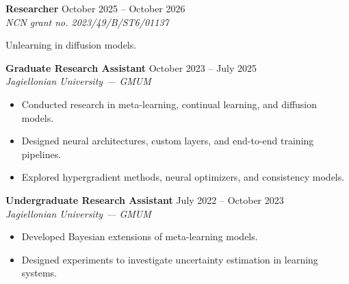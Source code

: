 \documentclass[11pt,a4paper]{article}
\begin{document}
\vspace{0.5pt}
\noindent\textbf{Researcher} \hfill {\small\color{graytext} October 2025 -- October 2026}\\
\textit{NCN grant no. 2023/49/B/ST6/01137}\par
\vspace{1pt}\noindent Unlearning in diffusion models.\par\vspace{1pt}
\vspace{0.5pt}
\noindent\textbf{Graduate Research Assistant} \hfill {\small\color{graytext} October 2023 -- July 2025}\\
\textit{Jagiellonian University --- GMUM}\par
\begin{itemize}[leftmargin=1.2em,topsep=0.5pt,itemsep=0.3pt,parsep=0pt]
  \item Conducted research in meta-learning, continual learning, and diffusion models.
  \item Designed neural architectures, custom layers, and end-to-end training pipelines.
  \item Explored hypergradient methods, neural optimizers, and consistency models.
\end{itemize}
\vspace{0.5pt}
\noindent\textbf{Undergraduate Research Assistant} \hfill {\small\color{graytext} July 2022 -- October 2023}\\
\textit{Jagiellonian University --- GMUM}\par
\begin{itemize}[leftmargin=1.2em,topsep=0.5pt,itemsep=0.3pt,parsep=0pt]
  \item Developed Bayesian extensions of meta-learning models.
  \item Designed experiments to investigate uncertainty estimation in learning systems.
\end{itemize}
\vspace{0.5pt}
\end{document}
